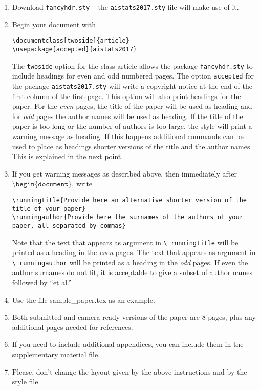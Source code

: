 \documentclass[twoside]{article} \usepackage{aistats2017}
\begin{document}
\begin{enumerate}
    \item Download \texttt{fancyhdr.sty} -- the
    \texttt{aistats2017.sty} file will make use of it.
    \item Begin your document with
    \begin{flushleft}
    \texttt{\textbackslash documentclass[twoside]\{article\}}\\
    \texttt{\textbackslash usepackage[accepted]\{aistats2017\}}
    \end{flushleft}
    The \texttt{twoside} option for the class article allows the
    package \texttt{fancyhdr.sty} to include headings for even and odd
    numbered pages. The option \texttt{accepted} for the package
    \texttt{aistats2017.sty} will write a copyright notice at the end of
    the first column of the first page. This option will also print
    headings for the paper.  For the \emph{even} pages, the title of
    the paper will be used as heading and for \emph{odd} pages the
    author names will be used as heading.  If the title of the paper
    is too long or the number of authors is too large, the style will
    print a warning message as heading. If this happens additional
    commands can be used to place as headings shorter versions of the
    title and the author names. This is explained in the next point.
    \item  If you get warning messages as described above, then
    immediately after $\texttt{\textbackslash
    begin\{document\}}$, write
    \begin{flushleft}
    \texttt{\textbackslash runningtitle\{Provide here an alternative shorter version of the title of your
    paper\}}\\
    \texttt{\textbackslash runningauthor\{Provide here the surnames of the authors of your paper, all separated by
    commas\}}
    \end{flushleft}
    Note that the text that appears as argument in \texttt{\textbackslash
      runningtitle} will be printed as a heading in the \emph{even}
    pages. The text that appears as argument in \texttt{\textbackslash
      runningauthor} will be printed as a heading in the \emph{odd}
    pages.  If even the author surnames do not fit, it is acceptable
    to give a subset of author names followed by ``et al.''

    \item Use the file sample\_paper.tex as an example.

    \item Both submitted and camera-ready versions of the paper are 8
      pages, plus any additional pages needed for references.

    \item If you need to include additional appendices,
      you can include them in the supplementary
      material file.

    \item Please, don't change the layout given by the above
      instructions and by the style file.

\end{enumerate}
\end{document}
